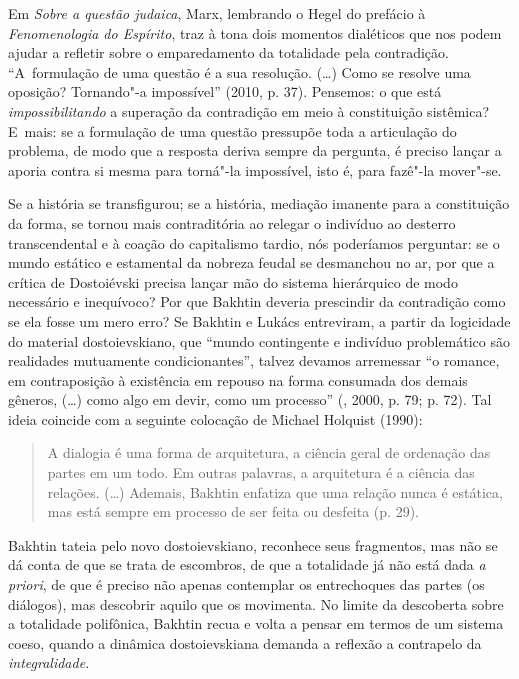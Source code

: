 Em \emph{Sobre a questão judaica}, Marx, lembrando o Hegel do prefácio à
\emph{Fenomenologia do Espírito}, traz à tona dois momentos dialéticos
que nos podem ajudar a refletir sobre o emparedamento da totalidade pela
contradição. ``A~formulação de uma questão é a sua resolução. (\ldots) Como
se resolve uma oposição? Tornando"-a impossível'' (2010, p. 37). Pensemos: o que está \emph{impossibilitando} a superação da contradição em meio à constituição sistêmica? E~mais: se a formulação de uma questão
pressupõe toda a articulação do problema, de modo que a resposta deriva
sempre da pergunta, é preciso lançar a aporia contra si mesma para
torná"-la impossível, isto é, para fazê"-la mover"-se.

Se a história se transfigurou; se a história, mediação imanente para a
constituição da forma, se tornou mais contraditória ao relegar o
indivíduo ao desterro transcendental e à coação do capitalismo tardio,
nós poderíamos perguntar: se o mundo estático e estamental da nobreza
feudal se desmanchou no ar, por que a crítica de Dostoiévski precisa
lançar mão do sistema hierárquico de modo necessário e inequívoco? Por
que Bakhtin deveria prescindir da contradição como se ela fosse um mero
erro? Se Bakhtin e Lukács entreviram, a partir da logicidade do material
dostoievskiano, que ``mundo contingente e indivíduo problemático são
realidades mutuamente condicionantes'', talvez devamos arremessar ``o
romance, em contraposição à existência em repouso na forma consumada dos
demais gêneros, (\ldots) como algo em devir, como um processo'' (,
2000, p. 79; p. 72). Tal ideia coincide com a seguinte colocação de
Michael Holquist (1990):

\begin{quote}
A dialogia é uma forma de arquitetura, a ciência geral de ordenação das
partes em um todo. Em outras palavras, a arquitetura é a ciência das
relações. (\ldots) Ademais, Bakhtin enfatiza que uma relação nunca é
estática, mas está sempre em processo de ser feita ou desfeita (p. 29).
\end{quote}

Bakhtin tateia pelo novo dostoievskiano, reconhece seus fragmentos, mas
não se dá conta de que se trata de escombros, de que a totalidade já não
está dada \emph{a priori}, de que é preciso não apenas contemplar os
entrechoques das partes (os diálogos), mas descobrir aquilo que os
movimenta. No limite da descoberta sobre a totalidade polifônica,
Bakhtin recua e volta a pensar em termos de um sistema coeso, quando a
dinâmica dostoievskiana demanda a reflexão a contrapelo da
\emph{integralidade. }

